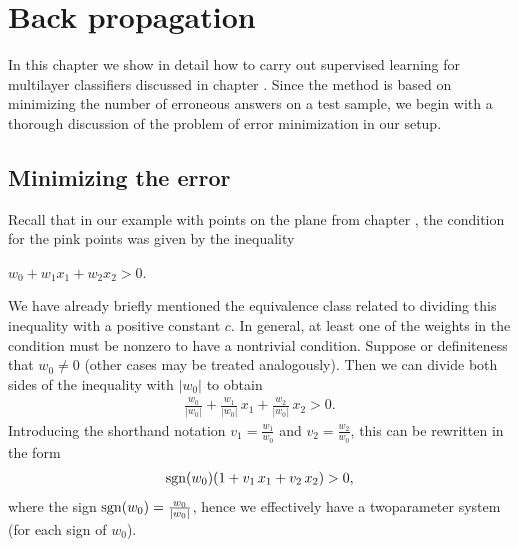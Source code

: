 \documentclass[a4paper,12pt,polish]{jupyterBook}
\begin{document}
\chapter{Back propagation}
\label{\detokenize{docs/backprop:back-propagation}}\label{\detokenize{docs/backprop::doc}}
\sphinxAtStartPar
In this chapter we show in detail  how to carry out supervised learning for multilayer classifiers discussed in chapter {\hyperref[\detokenize{docs/more_layers:more-lab}]{}}. Since the method is based on minimizing the number of erroneous answers on a test sample, we begin with a thorough discussion of the problem of error minimization in our setup.


\section{Minimizing the error}
\label{\detokenize{docs/backprop:minimizing-the-error}}
\sphinxAtStartPar
Recall that in our example with points on the plane from chapter {\hyperref[\detokenize{docs/perceptron:perc-lab}]{}}, the condition for the pink points was given by the inequality

\sphinxAtStartPar
\(w_0+w_1 x_1 + w_2 x_2 > 0\).

\sphinxAtStartPar
We have already briefly mentioned the equivalence class related to dividing this inequality with a positive constant \(c\). In general, at least one of the weights in the condition must be nonzero to have a nontrivial condition. Suppose or definiteness that \(w_0 \neq 0\) (other cases may be treated analogously). Then we can divide both sides of the inequality with \(|w_0|\) to obtain
\begin{equation*}
\begin{split}\frac{w_0}{|w_0|}+\frac{w_1}{|w_0|} \, x_1 + \frac{w_2}{|w_0|} \, x_2 > 0. \end{split}
\end{equation*}
\sphinxAtStartPar
Introducing the short\sphinxhyphen{}hand notation \(v_1=\frac{w_1}{w_0}\) and \(v_2=\frac{w_2}{w_0}\), this can be rewritten in the form
\begin{equation*}
\begin{split}{\rm sgn}(w_0)( 1+v_1 \, x_1 +v_2 \, x_2) > 0,\end{split}
\end{equation*}
\sphinxAtStartPar
where the sign \({\rm sgn}(w_0) = \frac{w_0}{|w_0|}\), hence we effectively have a two\sphinxhyphen{}parameter system (for each sign of \(w_0\)).
\end{document}
